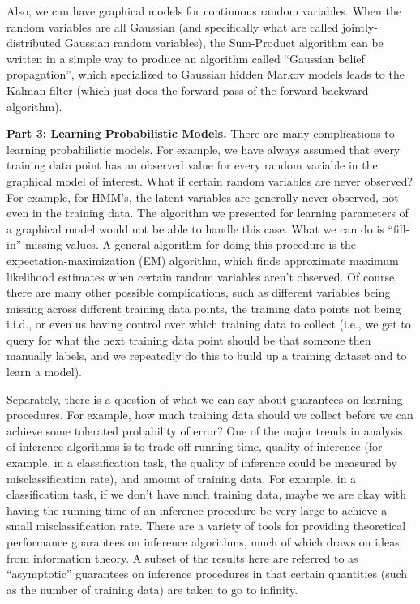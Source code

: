 Also, we can have graphical models for continuous random variables. When the random variables are all Gaussian (and specifically what are called jointly-distributed Gaussian random variables), the Sum-Product algorithm can be written in a simple way to produce an algorithm called ``Gaussian belief propagation'', which specialized to Gaussian hidden Markov models leads to the Kalman filter (which just does the forward pass of the forward-backward algorithm).

\textbf{Part 3: Learning Probabilistic Models.} There are many complications to learning probabilistic models. For example, we have always assumed that every training data point has an observed value for every random variable in the graphical model of interest. What if certain random variables are never observed? For example, for HMM's, the latent variables are generally never observed, not even in the training data. The algorithm we presented for learning parameters of a graphical model would not be able to handle this case. What we can do is ``fill-in'' missing values. A general algorithm for doing this procedure is the expectation-maximization (EM) algorithm, which finds approximate maximum likelihood estimates when certain random variables aren't observed. Of course, there are many other possible complications, such as different variables being missing across different training data points, the training data points not being i.i.d., or even us having control over which training data to collect (i.e., we get to query for what the next training data point should be that someone then manually labels, and we repeatedly do this to build up a training dataset and to learn a model).

Separately, there is a question of what we can say about guarantees on learning procedures. For example, how much training data should we collect before we can achieve some tolerated probability of error? One of the major trends in analysis of inference algorithms is to trade off running time, quality of inference (for example, in a classification task, the quality of inference could be measured by misclassification rate), and amount of training data. For example, in a classification task, if we don't have much training data, maybe we are okay with having the running time of an inference procedure be very large to achieve a small misclassification rate. There are a variety of tools for providing theoretical performance guarantees on inference algorithms, much of which draws on ideas from information theory. A subset of the results here are referred to as ``asymptotic'' guarantees on inference procedures in that certain quantities (such as the number of training data) are taken to go to infinity.


